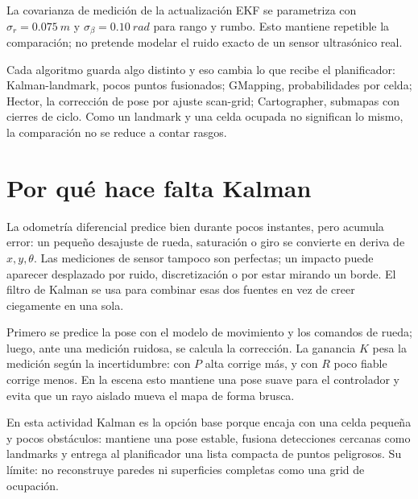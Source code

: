 La covarianza de medición de la actualización EKF se parametriza con
\(\sigma_r=\SI{0.075}{m}\) y \(\sigma_{\beta}=\SI{0.10}{rad}\) para rango y
rumbo. Esto mantiene repetible la comparación; no pretende modelar el ruido
exacto de un sensor ultrasónico real.

Cada algoritmo guarda algo distinto y eso cambia lo que recibe el planificador:
Kalman-landmark, pocos puntos fusionados; GMapping, probabilidades por celda;
Hector, la corrección de pose por ajuste scan-grid; Cartographer, submapas con
cierres de ciclo. Como un landmark y una celda ocupada no significan lo mismo, la
comparación no se reduce a contar rasgos.

\section{Por qué hace falta Kalman}

La odometría diferencial predice bien durante pocos instantes, pero acumula error:
un pequeño desajuste de rueda, saturación o giro se convierte en deriva de
\(x,y,\theta\). Las mediciones de sensor tampoco son perfectas; un impacto puede
aparecer desplazado por ruido, discretización o por estar mirando un borde. El
filtro de Kalman se usa para combinar esas dos fuentes en vez de creer ciegamente
en una sola.

Primero se predice la pose con el modelo de movimiento y los comandos de rueda;
luego, ante una medición ruidosa, se calcula la corrección. La ganancia \(K\)
pesa la medición según la incertidumbre: con \(P\) alta corrige más, y con \(R\)
poco fiable corrige menos. En la escena esto mantiene una pose suave para el
controlador y evita que un rayo aislado mueva el mapa de forma brusca.

En esta actividad Kalman es la opción base porque encaja con una celda pequeña
y pocos obstáculos: mantiene una pose
estable, fusiona detecciones cercanas como landmarks y entrega al planificador una lista
compacta de puntos peligrosos. Su límite: no reconstruye paredes ni superficies
completas como una grid de ocupación.

